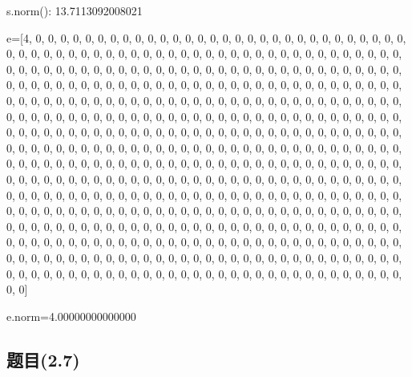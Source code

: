 \documentclass[12pt,a4paper]{article}
\numberwithin{equation}{section}
\begin{document}
s.norm(): 13.7113092008021

e=[4, 0, 0, 0, 0, 0, 0, 0, 0, 0, 0, 0, 0, 0, 0, 0, 0, 0, 0, 0, 0, 0, 0, 0, 0, 0, 0, 0, 0, 0, 0, 0, 0, 0, 0, 0, 0, 0, 0, 0, 0, 0, 0, 0, 0, 0, 0, 0, 0, 0, 0, 0, 0, 0, 0, 0, 0, 0, 0, 0, 0, 0, 0, 0, 0, 0, 0, 0, 0, 0, 0, 0, 0, 0, 0, 0, 0, 0, 0, 0, 0, 0, 0, 0, 0, 0, 0, 0, 0, 0, 0, 0, 0, 0, 0, 0, 0, 0, 0, 0, 0, 0, 0, 0, 0, 0, 0, 0, 0, 0, 0, 0, 0, 0, 0, 0, 0, 0, 0, 0, 0, 0, 0, 0, 0, 0, 0, 0, 0, 0, 0, 0, 0, 0, 0, 0, 0, 0, 0, 0, 0, 0, 0, 0, 0, 0, 0, 0, 0, 0, 0, 0, 0, 0, 0, 0, 0, 0, 0, 0, 0, 0, 0, 0, 0, 0, 0, 0, 0, 0, 0, 0, 0, 0, 0, 0, 0, 0, 0, 0, 0, 0, 0, 0, 0, 0, 0, 0, 0, 0, 0, 0, 0, 0, 0, 0, 0, 0, 0, 0, 0, 0, 0, 0, 0, 0, 0, 0, 0, 0, 0, 0, 0, 0, 0, 0, 0, 0, 0, 0, 0, 0, 0, 0, 0, 0, 0, 0, 0, 0, 0, 0, 0, 0, 0, 0, 0, 0, 0, 0, 0, 0, 0, 0, 0, 0, 0, 0, 0, 0, 0, 0, 0, 0, 0, 0, 0, 0, 0, 0, 0, 0, 0, 0, 0, 0, 0, 0, 0, 0, 0, 0, 0, 0, 0, 0, 0, 0, 0, 0, 0, 0, 0, 0, 0, 0, 0, 0, 0, 0, 0, 0, 0, 0, 0, 0, 0, 0, 0, 0, 0, 0, 0, 0, 0, 0, 0, 0, 0, 0, 0, 0, 0, 0, 0, 0, 0, 0, 0, 0, 0, 0, 0, 0, 0, 0, 0, 0, 0, 0, 0, 0, 0, 0, 0, 0, 0, 0, 0, 0, 0, 0, 0, 0, 0, 0, 0, 0, 0, 0, 0, 0, 0, 0, 0, 0, 0, 0, 0, 0, 0, 0, 0, 0, 0, 0, 0, 0, 0, 0, 0, 0, 0, 0, 0, 0, 0, 0, 0, 0, 0, 0, 0, 0, 0, 0, 0, 0, 0, 0, 0, 0, 0, 0, 0, 0, 0, 0, 0, 0, 0, 0, 0, 0, 0, 0, 0, 0, 0, 0, 0, 0, 0, 0, 0, 0, 0, 0, 0, 0, 0, 0, 0, 0, 0, 0, 0, 0, 0, 0, 0, 0, 0, 0, 0, 0, 0, 0, 0, 0, 0, 0, 0, 0, 0, 0, 0, 0, 0, 0, 0, 0, 0, 0, 0, 0, 0, 0, 0, 0, 0, 0, 0, 0, 0, 0, 0, 0, 0, 0, 0, 0, 0, 0, 0, 0, 0, 0, 0, 0, 0, 0, 0, 0, 0, 0, 0, 0, 0, 0, 0, 0, 0, 0, 0, 0, 0, 0, 0, 0, 0, 0, 0, 0, 0, 0, 0, 0, 0, 0, 0, 0, 0]

e.norm=4.00000000000000

\subsection{题目(2.7)}
\end{document}
